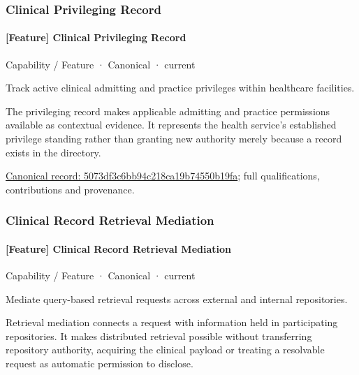 \subsubsection{Clinical Privileging Record}

\paragraph{[Feature] Clinical Privileging Record}

\label{element:5073df3c6bb94c218ca19b74550b19fa}
{\small Capability / Feature · Canonical · current}\par

Track active clinical admitting and practice privileges within healthcare facilities.



The privileging record makes applicable admitting and practice permissions available as contextual evidence. It represents the health service's established privilege standing rather than granting new authority merely because a record exists in the directory.


{\footnotesize \href{../../../../continuum/strategy/capability/feature/5073df3c6bb94c218ca19b74550b19fa.md}{Canonical record: 5073df3c6bb94c218ca19b74550b19fa}; full qualifications, contributions and provenance.}\par
\subsubsection{Clinical Record Retrieval Mediation}

\paragraph{[Feature] Clinical Record Retrieval Mediation}

\label{element:6f4a9c8f7916488bb0dd838ccccb1df4}
{\small Capability / Feature · Canonical · current}\par

Mediate query-based retrieval requests across external and internal repositories.



Retrieval mediation connects a request with information held in participating repositories. It makes distributed retrieval possible without transferring repository authority, acquiring the clinical payload or treating a resolvable request as automatic permission to disclose.


